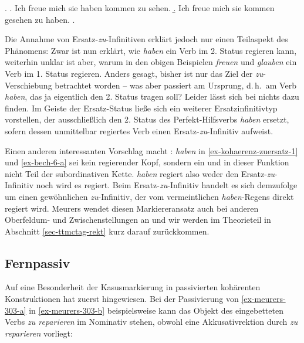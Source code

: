 \ex. 
\a. Ich freue mich sie haben kommen zu sehen. \label{ex-bech-6-a}
\b. Ich freue mich sie kommen gesehen zu haben. \label{ex-bech-6-b}
\z. \citep[\S 20]{Bech:63}

Die Annahme von Ersatz-\emph{zu}-Infinitiven erklärt jedoch nur einen Teilaspekt des Phänomens: Zwar ist nun erklärt, wie {\it haben} ein Verb im 2. Status regieren kann, weiterhin unklar ist aber, warum in den obigen Beispielen {\it freuen} und {\it glauben} ein Verb im 1. Status regieren. Anders gesagt, bisher ist nur das Ziel der \emph{zu}-Verschiebung betrachtet worden -- was aber passiert am Ursprung, d.\,h.\ am Verb {\it haben}, das ja eigentlich den 2. Status tragen soll? Leider lässt sich bei \cite{Bech:63} nichts dazu finden. Im Geiste der Ersatz-Status lie\ss e sich ein weiterer Ersatzinfinitivtyp vorstellen, der ausschlie\ss lich den 2. Status des Perfekt-Hilfsverbs {\it haben} ersetzt, sofern dessen unmittelbar regiertes Verb einen Ersatz-\emph{zu}-Infinitiv aufweist.  

Einen anderen interessanten Vorschlag macht \citet[189ff]{Meurers:99}: {\it haben} in \ref{ex-kohaerenz-zuersatz-1} und \ref{ex-bech-6-a} sei kein regierender Kopf, sondern ein  und in dieser Funktion nicht Teil der subordinativen Kette. {\it haben} regiert also weder den Ersatz-\emph{zu}-Infinitiv noch wird es regiert. Beim Ersatz-\emph{zu}-Infinitiv handelt es sich demzufolge um einen gewöhnlichen \emph{zu}-Infinitiv, der vom vermeintlichen {\it haben}-Regens direkt regiert wird. Meurers wendet diesen Markiereransatz auch bei anderen Oberfeldum- und Zwischenstellungen an und wir werden im Theorieteil in Abschnitt \ref{sec-ttmctag-rekt} kurz darauf zurückkommen. 


\subsection{Fernpassiv}\label{sec-fernpassiv}

Auf eine Besonderheit der Kasusmarkierung in passivierten kohärenten Konstruktionen hat zuerst \citet[175ff]{Hoehle:78} hingewiesen. Bei der Passivierung von \ref{ex-meurers-303-a} in \ref{ex-meurers-303-b} beispielsweise kann das Objekt des eingebetteten Verbs {\it zu reparieren} im Nominativ stehen, obwohl eine Akkusativrektion durch {\it zu reparieren} vorliegt:

